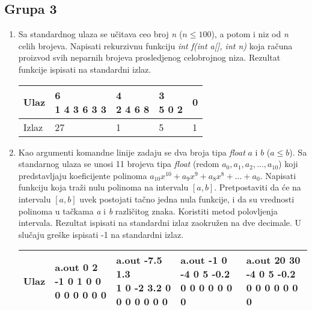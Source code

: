 \subsection{Grupa 3}

\begin{enumerate}

\item Sa standardnog ulaza se u\v citava ceo broj \emph{n} ($n \le 100$), a potom i niz od \emph{n} celih brojeva. Napisati rekurzivnu funkciju \emph{int f(int a[], int n)} koja ra\v cuna proizvod svih neparnih brojeva prosledjenog celobrojnog niza. Rezultat funkcije ispisati na standardni izlaz.



\small

\begin{tabular}{ |l|l|l|l|l| }

\hline

  Ulaz & \mlcell{6 \\ 1 4 3 6 3 3} & \mlcell{4 \\ 2 4 6 8} & \mlcell{3 \\ 5 0 2}& 0\\ \hline

  Izlaz &  27 &1 & 5 & 1\\ \hline

\end{tabular}

\normalsize



\item Kao argumenti komandne linije zadaju se dva broja tipa \emph{float} $a$ i $b$ ($a \le b$). Sa standarnog ulaza se unosi 11 brojeva tipa \emph{float} (redom $a_0, a_1, a_2, ...,a_{10}$) koji predstavljaju koeficijente polinoma $a_{10}x^{10} + a_9x^9 + a_8x^8 + ... + a_0$. Napisati funkciju koja tra\v zi nulu polinoma na intervalu $[a, b]$. Pretpostaviti da \' ce na intervalu $[a, b]$ uvek postojati ta\v cno jedna nula funkcije, i da su vrednosti polinoma u ta\v ckama \emph{a} i \emph{b} razli\v citog znaka. Koristiti metod polovljenja intervala. Rezultat ispisati na standardni izlaz zaokru\v zen na dve decimale. U slu\v caju gre\v ske ispisati -1 na standardni izlaz.



\small

\begin{tabular}{ |l|l|l|l|l| }

\hline

  Ulaz & \mlcell{a.out 0 2 \\ -1 0 1 0 0 0 0 0 0 0 0}&\mlcell{a.out -7.5 1.3 \\ 1 0 -2 3.2 0 0 0 0 0 0 0} & \mlcell{a.out -1 0 \\ -4 0 5 -0.2 0 0 0 0 0 0 0}& \mlcell{a.out 20 30 \\ -4 0 5 -0.2 0 0 0 0 0 0 0}\\ \hline


\end{tabular}
\end{enumerate}
